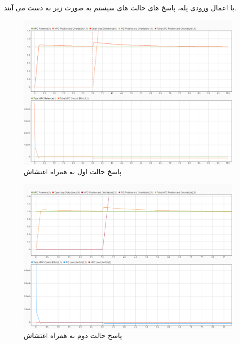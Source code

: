 با اعمال ورودی پله، پاسخ های حالت های سیستم به صورت زیر به دست می آیند.
\begin{figure}[H]
	\centering
	\includegraphics[width=1\linewidth]{../img/Disturbance_ResponseS1}
	\caption{پاسخ حالت اول به همراه اغتشاش}
	\label{fig:disturbanceresponses1}
\end{figure}
\begin{figure}[H]
	\centering
	\includegraphics[width=1\linewidth]{../img/Disturbance_ResponseS2}
	\caption{پاسخ حالت دوم به همراه اغتشاش}
	\label{fig:disturbanceresponses2}
\end{figure}
